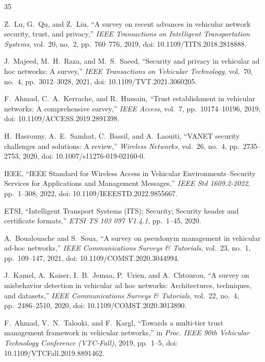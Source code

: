 \documentclass[conference]{IEEEtran}
\begin{document}
\begin{thebibliography}{35}

Z.~Lu, G.~Qu, and Z.~Liu,
``A survey on recent advances in vehicular network security, trust, and privacy,''
\textit{IEEE Transactions on Intelligent Transportation Systems}, vol.~20, no.~2, pp.~760--776, 2019, doi: 10.1109/TITS.2018.2818888.

J.~Majeed, M.~H.~Raza, and M.~S.~Saeed,
``Security and privacy in vehicular ad hoc networks: A survey,''
\textit{IEEE Transactions on Vehicular Technology}, vol.~70, no.~4, pp.~3012--3028, 2021, doi: 10.1109/TVT.2021.3060205.

F.~Ahmad, C.~A.~Kerrache, and R.~Hussain,
``Trust establishment in vehicular networks: A comprehensive survey,''
\textit{IEEE Access}, vol.~7, pp.~10174--10196, 2019, doi: 10.1109/ACCESS.2019.2891398.

H.~Hasrouny, A.~E.~Samhat, C.~Bassil, and A.~Laouiti,
``VANET security challenges and solutions: A review,''
\textit{Wireless Networks}, vol.~26, no.~4, pp.~2735--2753, 2020, doi: 10.1007/s11276-019-02160-0.

IEEE,
``IEEE Standard for Wireless Access in Vehicular Environments--Security Services for Applications and Management Messages,''
\textit{IEEE Std 1609.2-2022}, pp.~1--308, 2022, doi: 10.1109/IEEESTD.2022.9855667.

ETSI,
``Intelligent Transport Systems (ITS); Security; Security header and certificate formats,''
\textit{ETSI TS 103 097 V1.4.1}, pp.~1--45, 2020.

A.~Boualouache and S.~Soua,
``A survey on pseudonym management in vehicular ad-hoc networks,''
\textit{IEEE Communications Surveys \& Tutorials}, vol.~23, no.~1, pp.~109--147, 2021, doi: 10.1109/COMST.2020.3044994.

J.~Kamel, A.~Kaiser, I.~B.~Jemaa, P.~Urien, and A.~Chtourou,
``A survey on misbehavior detection in vehicular ad hoc networks: Architectures, techniques, and datasets,''
\textit{IEEE Communications Surveys \& Tutorials}, vol.~22, no.~4, pp.~2486--2510, 2020, doi: 10.1109/COMST.2020.3013890.

F.~Ahmad, V.~N.~Talooki, and F.~Kargl,
``Towards a multi-tier trust management framework in vehicular networks,''
in \textit{Proc. IEEE 90th Vehicular Technology Conference (VTC-Fall)}, 2019, pp.~1--5, doi: 10.1109/VTCFall.2019.8891462.


\end{thebibliography}
\end{document}
